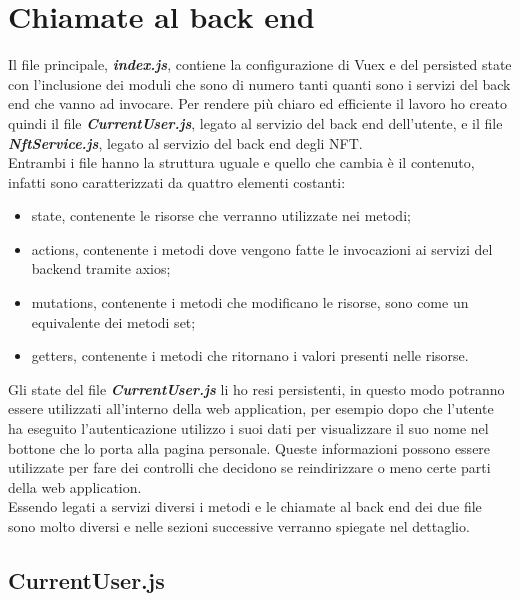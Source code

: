 \section{Chiamate al back end}
Il file principale, \textbf{\textit{index.js}}, contiene la configurazione di Vuex e del persisted state con l'inclusione dei moduli che sono di numero tanti quanti sono i servizi del back end che vanno ad invocare. Per rendere più chiaro ed efficiente il lavoro ho creato quindi il file \textbf{\textit{CurrentUser.js}}, legato al servizio del back end dell'utente, e il file \textbf{\textit{NftService.js}}, legato al servizio del back end degli NFT.\\
Entrambi i file hanno la struttura uguale e quello che cambia è il contenuto, infatti sono caratterizzati da quattro elementi costanti:
\begin{itemize}
	\item state, contenente le risorse che verranno utilizzate nei metodi;
	\item actions, contenente i metodi dove vengono fatte le invocazioni ai servizi del backend tramite axios;
	\item mutations, contenente i metodi che modificano le risorse, sono come un equivalente dei metodi set;
	\item getters, contenente i metodi che ritornano i valori presenti nelle risorse.
\end{itemize}

Gli state del file \textbf{\textit{CurrentUser.js}} li ho resi persistenti, in questo modo potranno essere utilizzati all'interno della web application, per esempio dopo che l'utente ha eseguito l'autenticazione utilizzo i suoi dati per visualizzare il suo nome nel bottone che lo porta alla pagina personale. Queste informazioni possono essere utilizzate per fare dei controlli che decidono se reindirizzare o meno certe parti della web application.\\
Essendo legati a servizi diversi i metodi e le chiamate al back end dei due file sono molto diversi e nelle sezioni successive verranno spiegate nel dettaglio.

\subsection{CurrentUser.js}

